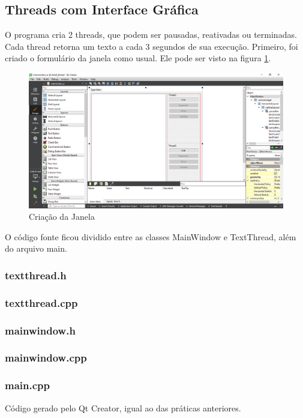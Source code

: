 \documentclass[12pt,a4paper]{article}
\begin{document}
\subsection{Threads com Interface Gráfica}
O programa cria 2 threads, que podem ser pausadas, reativadas ou terminadas. Cada thread retorna um texto a cada 3 segundos de sua execução.
Primeiro, foi criado o formulário da janela como usual. Ele pode ser visto na figura \ref{form}.
\begin{figure}[H]
\centering
\includegraphics[width=\textwidth]{thread_form}
\caption{Criação da Janela}
\label{form}
\end{figure}
O código fonte ficou dividido entre as classes MainWindow e TextThread, além do arquivo main.
\subsubsection*{textthread.h}

\subsubsection*{textthread.cpp}

\subsubsection*{mainwindow.h}

\subsubsection*{mainwindow.cpp}

\subsubsection*{main.cpp}
Código gerado pelo Qt Creator, igual ao das práticas anteriores.
\end{document}
